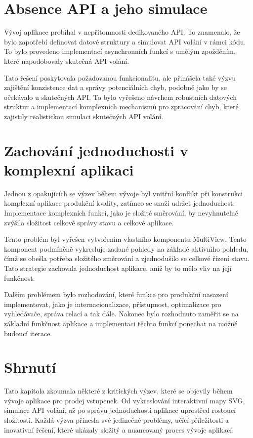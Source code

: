 \section{Absence API a jeho simulace}
\label{sec:vyzvy-a-problemy-absence-api}
Vývoj aplikace probíhal v nepřítomnosti dedikovaného API.
To znamenalo, že bylo zapotřebí definovat datové struktury a simulovat API volání v rámci kódu.
To bylo provedeno implementací asynchronních funkcí s umělým zpožděním, které napodobovaly skutečná API volání.

Tato řešení poskytovala požadovanou funkcionalitu, ale přinášela také výzvu zajištění konzistence dat a správy potenciálních chyb, podobně jako by se očekávalo u skutečných API.
To bylo vyřešeno návrhem robustních datových struktur a implementací komplexních mechanismů pro zpracování chyb, které zajistily realistickou simulaci skutečných API volání.

\section{Zachování jednoduchosti v komplexní aplikaci}
\label{sec:vyzvy-a-problemy-zachovani-jednoduchosti}
Jednou z opakujících se výzev během vývoje byl vnitřní konflikt při konstrukci komplexní aplikace produkční kvality, zatímco se snaží udržet jednoduchost.
Implementace komplexních funkcí, jako je složité směrování, by nevyhnutelně zvýšila složitost celkové správy stavu a celkové aplikace.

Tento problém byl vyřešen vytvořením vlastního komponentu MultiView.
Tento komponent podmíněně vykresluje zadané pohledy na základě aktivního pohledu, čímž se obešla potřeba složitého směrování a zjednodušilo se celkové řízení stavu.
Tato strategie zachovala jednoduchost aplikace, aniž by to mělo vliv na její funkčnost.

Dalším problémem bylo rozhodování, které funkce pro produkční nasazení implementovat, jako je internacionalizace, přístupnost, optimalizace pro vyhledávače, správa relací a tak dále.
Nakonec bylo rozhodnuto zaměřit se na základní funkčnost aplikace a implementaci těchto funkcí ponechat na možné budoucí iterace.

\section{Shrnutí}
\label{sec:vyzvy-a-problemy-shrnuti}
Tato kapitola zkoumala některé z kritických výzev, které se objevily během vývoje aplikace pro prodej vstupenek.
Od vykreslování interaktivní mapy SVG, simulace API volání, až po správu jednoduchosti aplikace uprostřed rostoucí složitosti.
Každá výzva přinesla své jedinečné problémy, učící příležitosti a inovativní řešení, které ukázaly složitý a nuancovaný proces vývoje aplikací.
